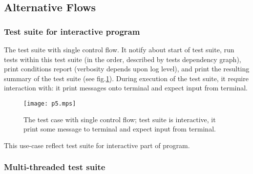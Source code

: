 \documentclass[a4paper,twoside]{article}
\begin{document}
\subsection{Alternative Flows}

\subsubsection{Test suite for interactive program}


The test suite with single control flow. It notify about start of test suite,
run tests within this test suite (in the order, described by tests dependency
graph), print conditions report (verbosity depends upon log level), and print the resulting summary of the test suite (see fig.\ref{InteractiveSingleFlow}).
During execution of the test suite, it require interaction with: it print
messages onto terminal and expect input from terminal.

\begin{figure}
  \begin{center}
  \texttt{[image: p5.mps]}
  \end{center}
  \caption{The test case with single control flow; test suite is
           interactive, it print some message to terminal and expect input
           from terminal.\label{InteractiveSingleFlow}}
\end{figure}

This use-case reflect test suite for interactive part of program.

\subsubsection{Multi-threaded test suite}

\end{document}
